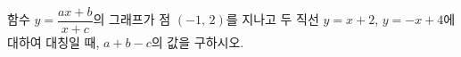\hspace*{2mm}\begin{minipage}[t]{\dimexpr\linewidth-2mm\relax}\vspace{0pt}
함수 $y=\dfrac{ax+b}{x+c}$의 그래프가 점 $(-1,\,2)$를 지나고 두 직선 $y=x+2$, $y=-x+4$에 대하여 대칭일 때, $a+b-c$의 값을 구하시오. \end{minipage}
